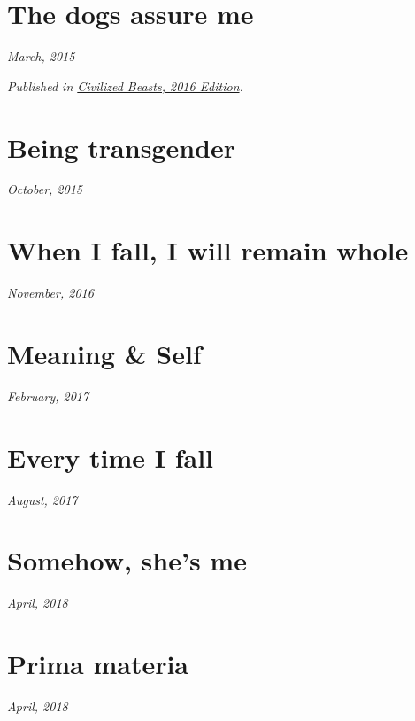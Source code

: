 \documentclass[10pt]{memoir}
\begin{document}
  \section{The dogs assure me}

  \hfill\textit{March, 2015}

  

  \textit{Published in \underline{Civilized Beasts, 2016 Edition}.}
  \cleartoverso


  \section{Being transgender}

  \hfill\textit{October, 2015}

  
  \newpage


  \section{When I fall, I will remain whole}

  \hfill\textit{November, 2016}

  
  \cleartoverso


  \section{Meaning \& Self}

  \hfill\textit{February, 2017}

  
  \newpage

  \section{Every time I fall}

  \hfill\textit{August, 2017}

  
  \newpage


  \section{Somehow, she's me}

  \hfill\textit{April, 2018}

  
  \newpage


  \section{Prima materia}

  \hfill\textit{April, 2018}

  
\end{document}
